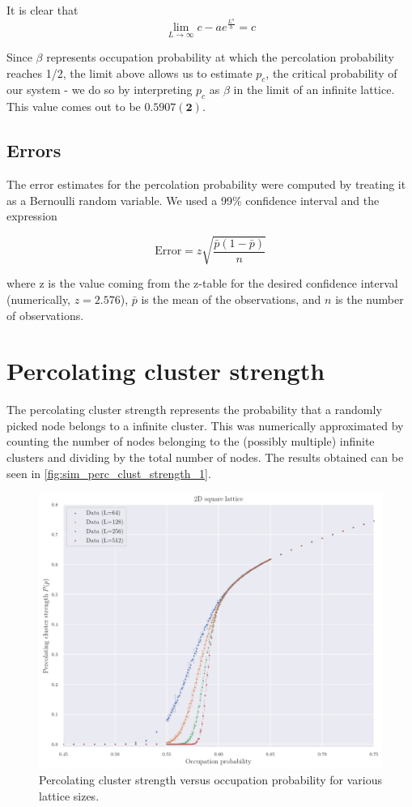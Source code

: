 It is clear that 
$$ 
\lim_{L\to\infty} c - a e^{\frac{L^n}{b}} = c
$$

Since $\beta$ represents occupation probability at which the percolation probability reaches 1/2, the limit above allows us to estimate $p_c$, the critical probability of our system - we do so by interpreting $p_c$ as $\beta$ in the limit of an infinite lattice. This value comes out to be $\mathbf{0.5907(2)}$.

\subsection{Errors}
\label{sec:error_perc_prob}
The error estimates for the percolation probability were computed by treating it as a Bernoulli random variable. We used a 99\% confidence interval and the expression 

$$ 
\textrm{Error} = z \sqrt{\frac{\bar{p}(1-\bar{p})}{n}}
$$

where z is the value coming from the z-table for the desired confidence interval (numerically, $z=2.576$), $\bar{p}$ is the mean of the observations, and $n$ is the number of observations\cite{bertsekas2008introduction}.

\section{Percolating cluster strength}

The percolating cluster strength represents the probability that a randomly picked node belongs to a infinite cluster. This was numerically approximated by counting the number of nodes belonging to the (possibly multiple) infinite clusters and dividing by the total number of nodes. The results obtained can be seen in \autoref{fig:sim_perc_clust_strength_1}.

\begin{figure}[H]
  \includegraphics[width=\linewidth]{Images/sim_perc_clust_strength_1.png}
  \caption{Percolating cluster strength versus occupation probability for various lattice sizes.}
  \label{fig:sim_perc_clust_strength_1}
\end{figure}


